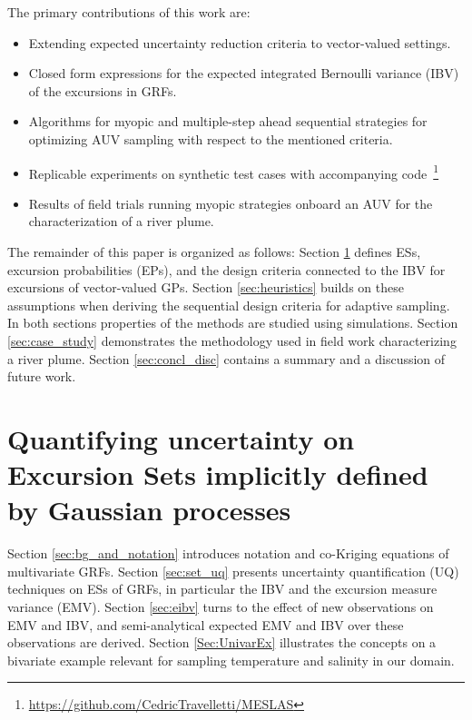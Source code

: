 \documentclass[aoas]{imsart}
\begin{document}
The primary contributions of this work are:

\begin{itemize}
\item Extending expected uncertainty reduction criteria to
  vector-valued settings.  
\item Closed form expressions for the expected integrated Bernoulli
  variance (IBV) of the excursions in GRFs. 
\item Algorithms for myopic and multiple-step ahead sequential
  strategies for optimizing AUV sampling with respect to the mentioned
  criteria. 
\item Replicable experiments on synthetic test cases with accompanying
  code~\footnote{\url{https://github.com/CedricTravelletti/MESLAS}}
\item Results of field trials running myopic strategies onboard an AUV
  for the characterization of a river plume. 
\end{itemize}

The remainder of this paper is organized as follows:
Section \ref{sec:ESEP} defines ESs, excursion probabilities (EPs), and
the design criteria connected to the IBV for excursions of
vector-valued GPs. Section \ref{sec:heuristics} builds on these
assumptions when deriving the sequential design criteria for adaptive
sampling. In both sections properties of the methods are studied using
simulations. Section \ref{sec:case_study} demonstrates the methodology
used in field work characterizing a river plume. Section
\ref{sec:concl_disc} contains a summary and a discussion of future
work.
%



\section{Quantifying uncertainty on Excursion Sets implicitly defined by Gaussian processes}
\label{sec:ESEP}

Section \ref{sec:bg_and_notation} introduces notation and co-Kriging
equations of multivariate GRFs.  Section \ref{sec:set_uq} presents
uncertainty quantification (UQ) techniques on ESs of GRFs, in
particular the IBV and the excursion measure variance (EMV).  Section
\ref{sec:eibv} turns to the effect of new observations on EMV and IBV,
and semi-analytical expected EMV and IBV over these observations are
derived.
Section \ref{Sec:UnivarEx} illustrates the concepts on a bivariate
example relevant for sampling temperature and salinity in our domain.
\end{document}
